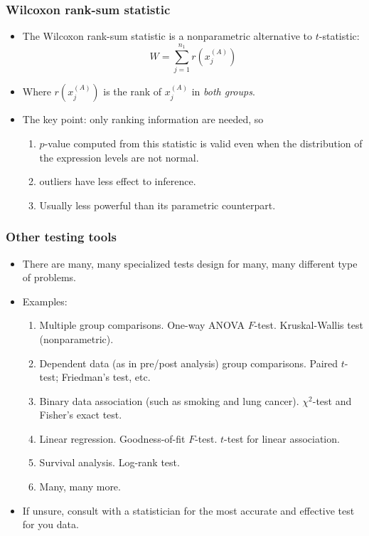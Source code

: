 \begin{frame}
  \frametitle{Wilcoxon rank-sum statistic}
  \begin{itemize}
  \item The Wilcoxon rank-sum statistic is a nonparametric alternative
    to $t$-statistic:
    \begin{equation}
      \label{eq:wilcoxon}
      W = \sum^{n_1}_{j=1} r(x^{(A)}_{j})
    \end{equation}
  \item Where $r(x^{(A)}_{j})$ is the rank of $x^{(A)}_{j}$ in
    \emph{both groups}.
  \item The key point: only ranking information are needed, so
    \begin{enumerate}
    \item $p$-value computed from this statistic is valid even when
      the distribution of the expression levels are not normal.
      \cite{Gibbons1992NonparametricStatisticalInference}
    \item outliers have less effect to inference.
    \item Usually less powerful than its parametric counterpart.
    \end{enumerate}
  \end{itemize}
\end{frame}

\begin{frame}
  \frametitle{Other testing tools}
  \begin{itemize}
  \item There are many, many specialized tests design for many, many
    different type of problems.
  \item Examples:
    \begin{enumerate}
    \item Multiple group comparisons. One-way ANOVA
      $F$-test. Kruskal-Wallis test (nonparametric).
    \item Dependent data (as in pre/post analysis) group
      comparisons. Paired $t$-test; Friedman's test, etc.
    \item Binary data association (such as smoking and lung cancer).
      $\chi^{2}$-test and Fisher's exact test.
    \item Linear regression.  Goodness-of-fit $F$-test. $t$-test for
      linear association.
    \item Survival analysis. Log-rank test.
    \item Many, many more.
    \end{enumerate}
  \item If unsure, consult with a statistician for the most accurate
    and effective test for you data.
  \end{itemize}
\end{frame}

